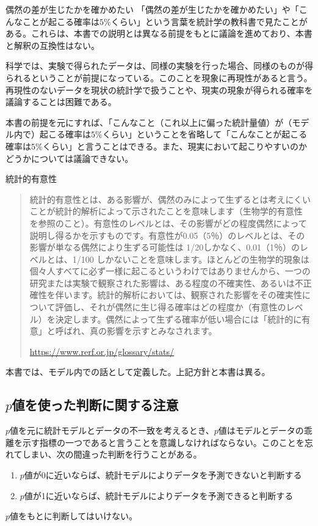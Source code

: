 \begin{SMbox}{偶然の差が生じたかを確かめたい}
    「偶然の差が生じたかを確かめたい」や「こんなことが起こる確率は$5\%$くらい」という言葉を統計学の教科書で見たことがある。これらは、本書での説明とは異なる前提をもとに議論を進めており、本書と解釈の互換性はない。

    科学では、実験で得られたデータは、同様の実験を行った場合、同様のものが得られるということが前提になっている。このことを現象に再現性があると言う。
    再現性のないデータを現状の統計学で扱うことや、現実の現象が得られる確率を議論することは困難である。

    本書の前提を元にすれば、「こんなこと（これ以上に偏った統計量値）が（モデル内で）起こる確率は$5\%$くらい」ということを省略して「こんなことが起こる確率は$5\%$くらい」と言うことはできる。また、現実において起こりやすいのかどうかについては議論できない。
\end{SMbox}


\begin{SMbox}{統計的有意性}
 \begin{quote}
  統計的有意性とは、ある影響が、偶然のみによって生ずるとは考えにくいことが統計的解析によって示されたことを意味します（生物学的有意性 を参照のこと）。有意性のレベルとは、その影響がどの程度偶然によって説明し得るかを示すものです。有意性が0.05（5％）のレベルとは、その影響が単なる偶然により生ずる可能性は 1/20しかなく、0.01（1％）のレベルとは、1/100 しかないことを意味します。ほとんどの生物学的現象は個々人すべてに必ず一様に起こるというわけではありませんから、一つの研究または実験で観察された影響は、ある程度の不確実性、あるいは不正確性を伴います。統計的解析においては、観察された影響をその確実性について評価し、それが偶然に生じ得る確率はどの程度か（有意性のレベル）を決定します。偶然によって生ずる確率が低い場合には「統計的に有意」と呼ばれ、真の影響を示すとみなされます。

  \url{https://www.rerf.or.jp/glossary/stats/}
 \end{quote}
 本書では、モデル内での話として定義した。上記方針と本書は異る。
\end{SMbox}


\subsection{$p$値を使った判断に関する注意}
$p$値を元に統計モデルとデータの不一致を考えるとき、$p$値はモデルとデータの乖離を示す指標の一つであると言うことを意識しなければならない。このことを忘れてしまい、次の間違った判断を行うことがある。
\begin{enumerate}
    \item $p$値が0に近いならば、統計モデルによりデータを予測できないと判断する
    \item $p$値が1に近いならば、統計モデルによりデータを予測できると判断する
\end{enumerate}
$p$値をもとに判断してはいけない。


